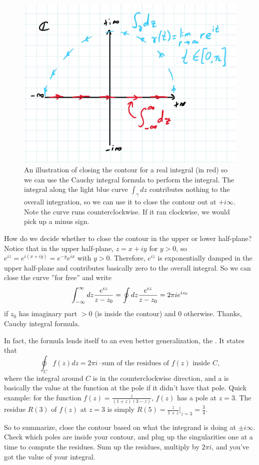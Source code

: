 \begin{figure}\label{fig_contour}
\includegraphics[width=0.8\linewidth]{2018/10/20180704_1.JPG}
\caption{An illustration of closing the contour for a real integral (in red) so we can use the Cauchy integral formula to perform the integral. The integral along the light blue curve $\int_\gamma dz$ contributes nothing to the overall integration, so we can use it to close the contour out at $+i\infty$. Note the curve runs counterclockwise. If it ran clockwise, we would pick up a minus sign.}
\end{figure}

How do we decide whether to close the contour in the upper or lower half-plane? Notice that in the upper half-plane, $z=x+iy$ for $y>0$, so $e^{iz}=e^{i(x+iy)}=e^{-y}e^{ix}$ with $y>0$. Therefore, $e^{iz}$ is exponentially damped in the upper half-plane and contributes basically zero to the overall integral. So we can close the curve ''for free'' and write
$$\int_{-\infty}^\infty dz \frac{e^{iz}}{z-z_0}=\oint dz \frac{e^{iz}}{z-z_0}=2\pi i e^{iz_0}$$
if $z_0$ has imaginary part $>0$ (is inside the contour) and $0$ otherwise. Thanks, Cauchy integral formula.

In fact, the formula lends itself to an even better generalization, the . It states that $$\oint_C f(z)dz = 2\pi i\cdot \text{sum of the residues of }f(z) \text{ inside } C,$$ where the integral around $C$ is in the counterclockwise direction, and a  is basically the value at the function at the pole if it didn't have that pole. Quick example: for the function $f(z)=\frac{z}{(1+z)(3-z)}$, $f(z)$ has a pole at $z=3$. The residue $R(3)$ of $f(z)$ at $z=3$ is simply $R(5)=\frac{z}{1+z}|_{z=3}=\frac{3}{4}.$

So to summarize, close the contour based on what the integrand is doing at $\pm i\infty$. Check which poles are inside your contour, and plug up the singularities one at a time to compute the residues. Sum up the residues, multiply by $2\pi i$, and you've got the value of your integral.

